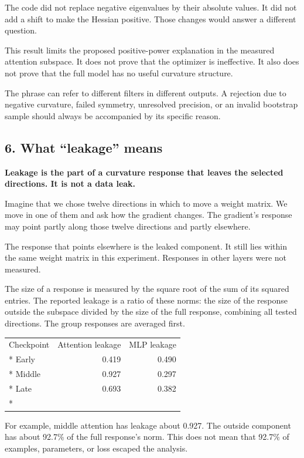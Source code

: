 \documentclass[
  14pt,
  letterpaper,
]{extarticle}
\newcounter{none} %
\begin{document}
The code did not replace negative eigenvalues by their absolute values.
It did not add a shift to make the Hessian positive. Those changes would
answer a different question.

This result limits the proposed positive-power explanation in the
measured attention subspace. It does not prove that the optimizer is
ineffective. It also does not prove that the full model has no useful
curvature structure.

The phrase can refer to different filters in different outputs. A
rejection due to negative curvature, failed symmetry, unresolved
precision, or an invalid bootstrap sample should always be accompanied
by its specific reason.

\subsection{6. What ``leakage'' means}\label{what-leakage-means}

\textbf{Leakage is the part of a curvature response that leaves the
selected directions. It is not a data leak.}

Imagine that we chose twelve directions in which to move a weight
matrix. We move in one of them and ask how the gradient changes. The
gradient's response may point partly along those twelve directions and
partly elsewhere.

The response that points elsewhere is the leaked component. It still
lies within the same weight matrix in this experiment. Responses in
other layers were not measured.

The size of a response is measured by the square root of the sum of its
squared entries. The reported leakage is a ratio of these norms: the
size of the response outside the subspace divided by the size of the
full response, combining all tested directions. The group responses are
averaged first.

{\def\LTcaptype{none} %
\begin{longtable}[]{@{}lrr@{}}
\toprule\noalign{}
Checkpoint & Attention leakage & MLP leakage \\*
\midrule\noalign{}
\endhead
\bottomrule\noalign{}
\endlastfoot
Early & 0.419 & 0.490 \\*
Middle & 0.927 & 0.297 \\*
Late & 0.693 & 0.382 \\*
\end{longtable}
}

For example, middle attention has leakage about 0.927. The outside
component has about 92.7\% of the full response's norm. This does not
mean that 92.7\% of examples, parameters, or loss escaped the analysis.
\end{document}
